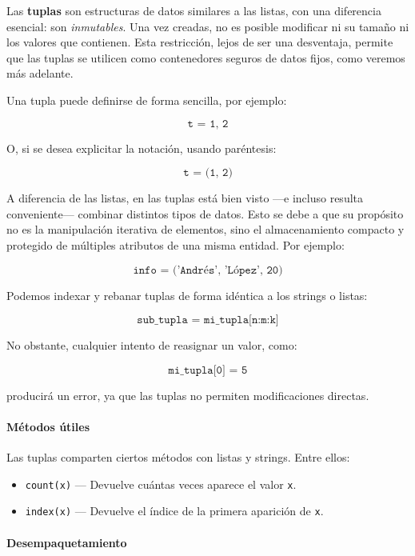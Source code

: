 \documentclass{article}
\theoremstyle{nonumberplain}
\begin{document}
Las \textbf{tuplas} son estructuras de datos similares a las listas, con una diferencia esencial: son \textit{inmutables}. Una vez creadas, no es posible modificar ni su tamaño ni los valores que contienen. Esta restricción, lejos de ser una desventaja, permite que las tuplas se utilicen como contenedores seguros de datos fijos, como veremos más adelante.

Una tupla puede definirse de forma sencilla, por ejemplo:

\[
\texttt{t = 1, 2}
\]

O, si se desea explicitar la notación, usando paréntesis:

\[
\texttt{t = (1, 2)}
\]

A diferencia de las listas, en las tuplas está bien visto —e incluso resulta conveniente— combinar distintos tipos de datos. Esto se debe a que su propósito no es la manipulación iterativa de elementos, sino el almacenamiento compacto y protegido de múltiples atributos de una misma entidad. Por ejemplo:

\[
\texttt{info = ('Andrés', 'López', 20)}
\]

Podemos indexar y rebanar tuplas de forma idéntica a los strings o listas:

\[
\texttt{sub\_tupla = mi\_tupla[n:m:k]}
\]

No obstante, cualquier intento de reasignar un valor, como:

\[
\texttt{mi\_tupla[0] = 5}
\]

producirá un error, ya que las tuplas no permiten modificaciones directas.

\paragraph{Métodos útiles}

Las tuplas comparten ciertos métodos con listas y strings. Entre ellos:

\begin{itemize}
    \item \texttt{count(x)} — Devuelve cuántas veces aparece el valor \texttt{x}.
    \item \texttt{index(x)} — Devuelve el índice de la primera aparición de \texttt{x}.
\end{itemize}

\paragraph{Desempaquetamiento}
\end{document}
